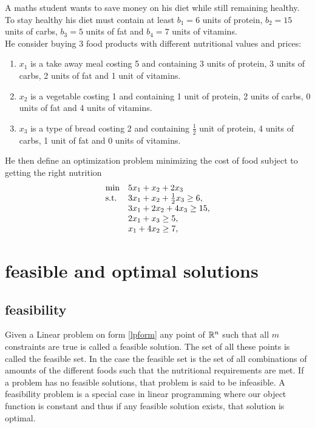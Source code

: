 \begin{example}\label{lpex}
A maths student wants to save money on his diet while still remaining healthy. To stay healthy his diet must contain at least $b_1=6$ units of protein, $b_2=15$ units of carbs, $b_3=5$ units of fat and $b_4=7$ units of vitamins.\\
He consider buying 3 food products with different nutritional values and prices: 
\begin{enumerate}
\item $x_1$ is a take away meal costing 5 and containing 3 units of protein, 3 units of carbs, 2 units of fat and 1 unit of vitamins.
\item $x_2$ is a vegetable costing 1 and containing 1 unit of protein, 2 units of carbs, 0 units of fat and 4 units of vitamins.
\item $x_3$ is a type of bread costing 2 and containing $\frac{1}{2}$ unit of protein, 4 units of carbs, 1 unit of fat and 0 units of vitamins.
\end{enumerate}
He then define an optimization problem minimizing the cost of food subject to getting the right nutrition
\begin{align}
\begin{array}{ll@{}ll}
\text{min} &5x_1+x_2+2x_3&\\
\text{s.t.} &3x_1+x_2+\frac{1}{2}x_3 \geq 6,&\\
&3x_1+2x_2+4x_3 \geq 15,&\\
&2x_1+x_3 \geq 5,&\\
&x_1+4x_2 \geq 7,&\\
\end{array}
\end{align}
\end{example}
\section{feasible and optimal solutions}
\subsection{feasibility}
Given a Linear problem on form \ref{lpform} any point of $\mathbb{R}^n$ such that all $m$ constraints are true is called a feasible solution. The set of all these points is called the feasible set. In the case  the feasible set is the set of all combinations of amounts of the different foods such that the nutritional requirements are met. If a problem has no feasible solutions, that problem is said to be infeasible. A feasibility problem is a special case in linear programming where our object function is constant and thus if any feasible solution exists, that solution is optimal.
